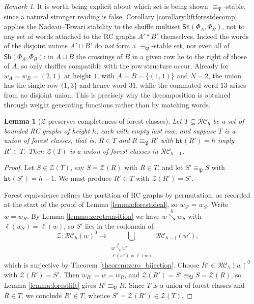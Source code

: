 \documentclass{amsart}
\newtheorem{lemma}{Lemma}[subsection]
\theoremstyle{definition}
\theoremstyle{remark}
\newtheorem*{remark}{Remark}
\numberwithin{equation}{subsection}
\newcommand{\downvar}[1]{\stackrel{#1}{\searrow}}
\newcommand{\wof}[1]{w_{#1}}
\newcommand{\zeromap}{\mathcal{Z}}
\newcommand{\hr}{\mathtt{ht}}
\newcommand{\RC}{\mathcal{RC}}
\newcommand{\forest}{\mathfrak{P}}
\begin{document}
\begin{remark}
It is worth being explicit about which set is being shown $\equiv_\forest$-stable, since a natural stronger reading is false. Corollary \ref{corollary:liftforestdecomp} applies the Nadeau--Tewari stability to the shuffle multiset $\mathsf{Sh}(\Phi_A,\Phi_B)$, not to any set of words attached to the RC graphs $A'*B'$ themselves. Indeed the words of the disjoint unions $A'\sqcup B'$ do \emph{not} form a $\equiv_\forest$-stable set, nor even all of $\mathsf{Sh}(\Phi_A,\Phi_B)$: in $A\sqcup B$ the crossings of $B$ in a given row lie to the right of those of $A$, so only shuffles compatible with the row structure occur. Already for $\wof A=\wof B=(2,1)$ at height $1$, with $A=B=\{(1,1)\}$ and $N=2$, the union has the single row $\{1,3\}$ and hence word $31$, while the commuted word $13$ arises from no disjoint union. This is precisely why the decomposition is obtained through weight generating functions rather than by matching words.
\end{remark}

\begin{lemma}[$\zeromap$ preserves completeness of forest classes]\label{lemma:zeroforestcomplete}
Let $T\subseteq\RC_h$ be a set of bounded RC graphs of height $h$, each with empty last row, and suppose $T$ is a union of forest classes, that is, $R\in T$ and $R\equiv_\forest R'$ with $\hr(R')=h$ imply $R'\in T$. Then $\zeromap(T)$ is a union of forest classes in $\RC_{h-1}$.
\end{lemma}
\begin{proof}
Let $S\in\zeromap(T)$, say $S=\zeromap(R)$ with $R\in T$, and let $S'\equiv_\forest S$ with $\hr(S')=h-1$. We must produce $R'\in T$ with $\zeromap(R')=S'$.

Forest equivalence refines the partition of RC graphs by permutation, as recorded at the start of the proof of Lemma \ref{lemma:forestideal}, so $\wof{S'}=\wof S$. Write $w=\wof R$. By Lemma \ref{lemma:zerotransition} we have $w\downvar{h}\wof S$ with $\ell(\wof S)=\ell(w)$, so $S'$ lies in the codomain of
$$\zeromap:\RC_h(w)^{0}\to\bigcup_{\substack{w\downvar{h}w'\\ \ell(w')=\ell(w)}}\RC_{h-1}(w'),$$
which is surjective by Theorem \ref{theorem:zero_bijection}. Choose $R'\in\RC_h(w)^{0}$ with $\zeromap(R')=S'$. Then $\wof{R'}=w=\wof R$, and $\zeromap(R')=S'\equiv_\forest S=\zeromap(R)$, so Lemma \ref{lemma:forestlift} gives $R'\equiv_\forest R$. Since $T$ is a union of forest classes and $R\in T$, we conclude $R'\in T$, whence $S'=\zeromap(R')\in\zeromap(T)$.
\end{proof}
\end{document}
